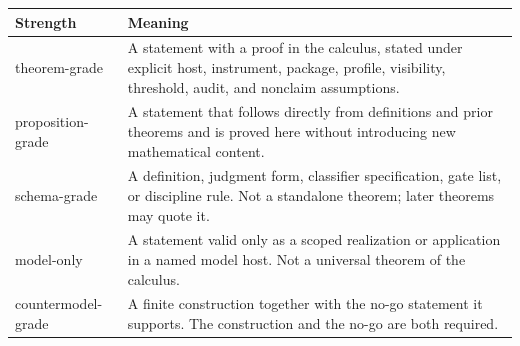 \documentclass[11pt]{article}
\theoremstyle{definition}
\begin{document}
\begin{longtable}[]{@{}ll@{}}
\toprule
\begin{minipage}[b]{0.47\columnwidth}\raggedright
Strength\strut
\end{minipage} & \begin{minipage}[b]{0.47\columnwidth}\raggedright
Meaning\strut
\end{minipage}\tabularnewline
\midrule
\endhead
\begin{minipage}[t]{0.47\columnwidth}\raggedright
theorem-grade\strut
\end{minipage} & \begin{minipage}[t]{0.47\columnwidth}\raggedright
A statement with a proof in the calculus, stated under explicit host, instrument, package, profile, visibility, threshold, audit, and nonclaim assumptions.\strut
\end{minipage}\tabularnewline
\begin{minipage}[t]{0.47\columnwidth}\raggedright
proposition-grade\strut
\end{minipage} & \begin{minipage}[t]{0.47\columnwidth}\raggedright
A statement that follows directly from definitions and prior theorems and is proved here without introducing new mathematical content.\strut
\end{minipage}\tabularnewline
\begin{minipage}[t]{0.47\columnwidth}\raggedright
schema-grade\strut
\end{minipage} & \begin{minipage}[t]{0.47\columnwidth}\raggedright
A definition, judgment form, classifier specification, gate list, or discipline rule. Not a standalone theorem; later theorems may quote it.\strut
\end{minipage}\tabularnewline
\begin{minipage}[t]{0.47\columnwidth}\raggedright
model-only\strut
\end{minipage} & \begin{minipage}[t]{0.47\columnwidth}\raggedright
A statement valid only as a scoped realization or application in a named model host. Not a universal theorem of the calculus.\strut
\end{minipage}\tabularnewline
\begin{minipage}[t]{0.47\columnwidth}\raggedright
countermodel-grade\strut
\end{minipage} & \begin{minipage}[t]{0.47\columnwidth}\raggedright
A finite construction together with the no-go statement it supports. The construction and the no-go are both required.\strut

\end{minipage}
\end{longtable}
\end{document}
